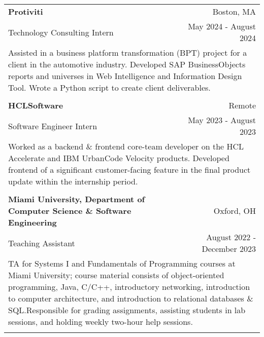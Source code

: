 \documentclass[letterpaper,8pt]{article} %
\begin{document}
\footnotesize{
\begin{tabular*}{\linewidth}{@{\extracolsep{\fill}} lr }

\textbf{Protiviti} & \footnotesize{Boston, MA}\\
\footnotesize{Technology Consulting Intern} & \footnotesize{May 2024 - August 2024}\\
\multicolumn{2}{p{\linewidth}}{\footnotesize{Assisted in a business platform transformation (BPT) project for a client in the automotive industry. Developed SAP BusinessObjects reports and universes in Web Intelligence and Information Design Tool. Wrote a Python script to create client deliverables.}}\\
\multicolumn{2}{c}{} \\

\textbf{HCLSoftware} & \footnotesize{Remote}\\
\footnotesize{Software Engineer Intern} & \footnotesize{May 2023 - August 2023}\\
\multicolumn{2}{p{\linewidth}}{\footnotesize{Worked as a backend \& frontend core-team developer on the HCL Accelerate and IBM UrbanCode Velocity products. Developed frontend of a significant customer-facing feature in the final product update within the internship period.}}\\
\multicolumn{2}{c}{} \\

    
\textbf{Miami University, Department of Computer Science \& Software Engineering} & \footnotesize{Oxford, OH}\\
\footnotesize{Teaching Assistant} & \footnotesize{August 2022 - December 2023}\\
\multicolumn{2}{p{\linewidth}}{\footnotesize{TA for Systems I and Fundamentals of Programming courses at Miami University; course material consists of object-oriented programming, Java, C/C++, introductory networking, introduction to computer architecture, and introduction to relational databases \& SQL.\@ Responsible for grading assignments, assisting students in lab sessions, and holding weekly two-hour help sessions.}}\\
\multicolumn{2}{c}{} \\


\end{tabular*}}
\end{document}
